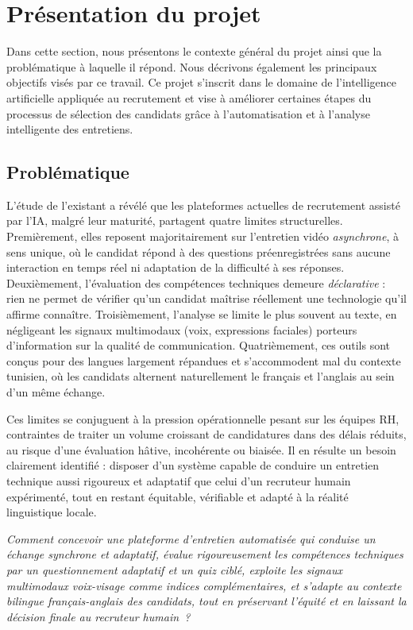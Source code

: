         \section{Présentation du projet}

Dans cette section, nous présentons le contexte général du projet ainsi que la problématique à laquelle il répond. Nous décrivons également les principaux objectifs visés par ce travail. Ce projet s’inscrit dans le domaine de l’intelligence artificielle appliquée au recrutement et vise à améliorer certaines étapes du processus de sélection des candidats grâce à l’automatisation et à l’analyse intelligente des entretiens.

\subsection{Problématique}

L’étude de l’existant a révélé que les plateformes actuelles de recrutement assisté par l’IA, malgré leur maturité, partagent quatre limites structurelles. Premièrement, elles reposent majoritairement sur l’entretien vidéo \textit{asynchrone}, à sens unique, où le candidat répond à des questions préenregistrées sans aucune interaction en temps réel ni adaptation de la difficulté à ses réponses. Deuxièmement, l’évaluation des compétences techniques demeure \textit{déclarative} : rien ne permet de vérifier qu’un candidat maîtrise réellement une technologie qu’il affirme connaître. Troisièmement, l’analyse se limite le plus souvent au texte, en négligeant les signaux multimodaux (voix, expressions faciales) porteurs d’information sur la qualité de communication. Quatrièmement, ces outils sont conçus pour des langues largement répandues et s’accommodent mal du contexte tunisien, où les candidats alternent naturellement le français et l’anglais au sein d’un même échange.

Ces limites se conjuguent à la pression opérationnelle pesant sur les équipes RH, contraintes de traiter un volume croissant de candidatures dans des délais réduits, au risque d’une évaluation hâtive, incohérente ou biaisée. Il en résulte un besoin clairement identifié : disposer d’un système capable de conduire un entretien technique aussi rigoureux et adaptatif que celui d’un recruteur humain expérimenté, tout en restant équitable, vérifiable et adapté à la réalité linguistique locale.

\noindent\textit{Comment concevoir une plateforme d’entretien automatisée qui conduise un échange synchrone et adaptatif, évalue rigoureusement les compétences techniques par un questionnement adaptatif et un quiz ciblé, exploite les signaux multimodaux voix-visage comme indices complémentaires, et s’adapte au contexte bilingue français-anglais des candidats, tout en préservant l’équité et en laissant la décision finale au recruteur humain~?}


